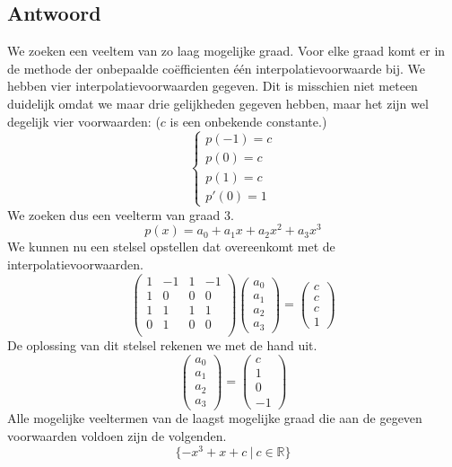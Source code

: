 \documentclass[examenvragen.tex]{subfiles}
\begin{document}
\subsection{Antwoord}
We zoeken een veeltem van zo laag mogelijke graad. Voor elke graad komt er in de methode der onbepaalde co\"efficienten \'e\'en interpolatievoorwaarde bij. We hebben vier interpolatievoorwaarden gegeven. Dit is misschien niet meteen duidelijk omdat we maar drie gelijkheden gegeven hebben, maar het zijn wel degelijk vier voorwaarden: ($c$ is een onbekende constante.)
\[
\left\{
\begin{array}{c}
p(-1) = c\\
p(0) = c\\
p(1) = c\\
p'(0) = 1
\end{array}
\right.
\]
We zoeken dus een veelterm van graad $3$.
\[
p(x) = a_0 + a_1x + a_2x^2 + a_3x^3
\]
We kunnen nu een stelsel opstellen dat overeenkomt met de interpolatievoorwaarden.
\[
\begin{pmatrix}
1 & -1 & 1 & -1\\
1&0&0&0\\
1 & 1 & 1 & 1\\
0&1&0&0\\
\end{pmatrix}
\begin{pmatrix}
a_0\\a_1\\a_2\\a_3
\end{pmatrix}
=
\begin{pmatrix}
c\\c\\c\\1
\end{pmatrix}
\]
De oplossing van dit stelsel rekenen we met de hand uit.
\[
\begin{pmatrix}
a_0\\a_1\\a_2\\a_3
\end{pmatrix}
=
\begin{pmatrix}
c \\1\\ 0\\ -1
\end{pmatrix}
\]
Alle mogelijke veeltermen van de laagst mogelijke graad die aan de gegeven voorwaarden voldoen zijn de volgenden.
\[
\{ -x^3 + x + c \ |\ c \in \mathbb{R}\}
\]
\end{document}
